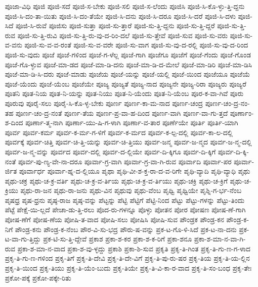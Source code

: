 {ಪೂಜಾ-ವಿಧಿ
ಪೂಜಿ
ಪೂಜಿ-ಸದೆ
ಪೂಜಿ-ಸ-ಬೇಕು
ಪೂಜಿ-ಸಲಿ
ಪೂಜಿ-ಸ-ಲೆಂದು
ಪೂಜಿಸಿ
ಪೂಜಿ-ಸಿ-ಕೊ-ಳ್ಳು-ತ್ತಿ-ದ್ದನು
ಪೂಜಿ-ಸಿ-ದಂ-ತಾ-ಯಿತು
ಪೂಜಿ-ಸಿ-ದಂ-ತೆಯೇ
ಪೂಜಿ-ಸಿ-ದನು
ಪೂಜಿ-ಸಿ-ದರೂ
ಪೂಜಿ-ಸಿ-ದರೆ
ಪೂಜಿ-ಸಿ-ದಳು
ಪೂಜಿ-ಸಿದೆ
ಪೂಜಿ-ಸಿ-ರುವೆ
ಪೂಜಿಸು
ಪೂಜಿ-ಸುತ್ತಾ
ಪೂಜಿ-ಸು-ತ್ತಾರೆ
ಪೂಜಿ-ಸು-ತ್ತಿ-ದ್ದನು
ಪೂಜಿ-ಸು-ತ್ತಿ-ದ್ದರೆ
ಪೂಜಿ-ಸು-ತ್ತಿ-ರುವ
ಪೂಜಿ-ಸು-ತ್ತಿ-ರುವಿ
ಪೂಜಿ-ಸು-ತ್ತಿ-ರು-ವು-ದ-ರಿಂ-ದಲೆ
ಪೂಜಿ-ಸು-ತ್ತೇವೆ
ಪೂಜಿ-ಸುವ
ಪೂಜಿ-ಸು-ವರು
ಪೂಜಿ-ಸು-ವ-ವನು
ಪೂಜಿ-ಸು-ವ-ವ-ರಂತೆ
ಪೂಜಿ-ಸು-ವ-ವರೇ
ಪೂಜಿ-ಸು-ವಾಗ
ಪೂಜಿ-ಸು-ವು-ದ-ರಲ್ಲಿ
ಪೂಜಿ-ಸು-ವು-ದ-ರಿಂದ
ಪೂಜಿ-ಸು-ವುದು
ಪೂಜೆ
ಪೂಜೆ-ಗಳಿಂದ
ಪೂಜೆ-ಗ-ಳೆಲ್ಲ
ಪೂಜೆ-ಗಾಗಿ
ಪೂಜೆಗೂ
ಪೂಜೆಗೆ
ಪೂಜೆ-ಗೆಂದು
ಪೂಜೆ-ಗೊಂಡ
ಪೂಜೆ-ಗೊ-ಳ್ಳುವ
ಪೂಜೆ-ಮಾ-ಡದ
ಪೂಜೆ-ಮಾ-ಡಿ-ದನು
ಪೂಜೆ-ಮಾ-ಡಿ-ದ-ಮೇಲೆ
ಪೂಜೆ-ಮಾ-ಡಿರಿ
ಪೂಜೆ-ಮಾ-ಡಿಸಿ
ಪೂಜೆ-ಮಾ-ಡಿ-ಸಿ-ದರು
ಪೂಜೆ-ಮಾಡು
ಪೂಜೆಯ
ಪೂಜೆ-ಯನ್ನು
ಪೂಜೆ-ಯಲ್ಲಿ
ಪೂಜೆ-ಯಿಂದ
ಪೂಜೆಯೂ
ಪೂಜೆಯೆ
ಪೂಜೆ-ಯೆಂದು
ಪೂಜೆ-ಯೆಂಬ
ಪೂಜೆಯೇ
ಪೂಜ್ಯ
ಪೂಜ್ಯತೆ
ಪೂಜ್ಯ-ನಾದ
ಪೂಜ್ಯನೇ
ಪೂಜ್ಯ-ರಿರಾ
ಪೂಜ್ಯರು
ಪೂಜ್ಯರೆ
ಪೂತನಿ
ಪೂತ-ನಿಯ
ಪೂತ-ನಿ-ಯನ್ನು
ಪೂತ-ನಿಯು
ಪೂತ-ನಿ-ಯೆಂದು
ಪೂತ-ನಿ-ಯೆಂಬ
ಪೂರ-ಕ-ವಾ-ಗಿವೆ
ಪೂರು
ಪೂರುವು
ಪೂರೈ-ಸಲು
ಪೂರೈ-ಸಿ-ಕೊ-ಳ್ಳ-ಬೇಕು
ಪೂರ್ಣ
ಪೂರ್ಣ-ಕಾ-ಮ-ನಾದ
ಪೂರ್ಣ-ಚಂದ್ರ
ಪೂರ್ಣ-ಚಂ-ದ್ರ-ನಂ-ತಹ
ಪೂರ್ಣ-ಚಂ-ದ್ರ-ನಂತೆ
ಪೂರ್ಣ-ತೆಯ
ಪೂರ್ಣ-ಪ್ರ-ವಾ-ಹ-ದಿಂದ
ಪೂರ್ಣ-ವಾಗಿ
ಪೂರ್ಣ-ವಾ-ಗು-ತ್ತದೆ
ಪೂರ್ಣಾಂ-ಶ-ದಿಂದ
ಪೂರ್ಣಾ-ತ್ಮ-ನಾಗಿ
ಪೂರ್ಣಾ-ಯು-ಷಿ-ಗ-ಳಾಗಿ
ಪೂರ್ಣಾ-ವ-ತಾರ
ಪೂರ್ಣೆಯೇ
ಪೂರ್ತಿ
ಪೂರ್ತಿ-ಯಾಗಿ
ಪೂರ್ವ
ಪೂರ್ವ-ಕರ್ಮ
ಪೂರ್ವ-ಕ-ರ್ಮ-ಗ-ಳಿಗೆ
ಪೂರ್ವ-ಕ-ರ್ಮದ
ಪೂರ್ವ-ಕ-ಲ್ಪ-ದಲ್ಲಿ
ಪೂರ್ವ-ಕಾ-ಲ-ದಲ್ಲಿ
ಪೂರ್ವಕ್ಕೆ
ಪೂರ್ವ-ಚಿತ್ತಿ
ಪೂರ್ವ-ಚಿ-ತ್ತಿ-ಯನ್ನು
ಪೂರ್ವ-ಚಿ-ತ್ತಿಯು
ಪೂರ್ವ-ಜನ್ಮ
ಪೂರ್ವ-ಜ-ನ್ಮದ
ಪೂರ್ವ-ಜ-ನ್ಮ-ದಲ್ಲಿ
ಪೂರ್ವ-ಜ-ನ್ಮ-ವನ್ನು
ಪೂರ್ವದ
ಪೂರ್ವ-ದಲ್ಲಿ
ಪೂರ್ವ-ದ-ಲ್ಲಿಯೇ
ಪೂರ್ವ-ದಿ-ಕ್ಕಿಗೂ
ಪೂರ್ವ-ದಿ-ಕ್ಕಿಗೆ
ಪೂರ್ವ-ದಿ-ಕ್ಕಿ-ನಂತೆ
ಪೂರ್ವ-ಪು-ಣ್ಯ-ವೇ-ನಾ-ದರೂ
ಪೂರ್ವಾ-ಗ್ರ-ವಾಗಿ
ಪೂರ್ವಾ-ಗ್ರ-ವಾ-ಗಿ-ರುವ
ಪೂರ್ವಾದಿ
ಪೂರ್ವಾ-ಪರ
ಪೂರ್ವಾ-ರ್ಜಿತ
ಪೂರ್ವಾರ್ಧ
ಪೂರ್ವಾ-ಹ್ನ-ದ-ಲ್ಲಿಯೂ
ಪೃಥಾ
ಪೃಥಿ-ವೀ-ಶ-ಕ್ತ-ರಾ-ದ-ವ-ರಿಗೇ
ಪೃಥಿ-ವ್ಯಾದಿ
ಪೃಥಿ-ವ್ಯಾಧಿ
ಪೃಥು
ಪೃಥು-ಚಕ್ರ
ಪೃಥು-ಚ-ಕ್ರ-ವರ್ತಿ
ಪೃಥು-ಚ-ಕ್ರ-ವ-ರ್ತಿಯ
ಪೃಥು-ಚ-ಕ್ರ-ವ-ರ್ತಿಯು
ಪೃಥು-ಚಕ್ರಿ
ಪೃಥು-ಚ-ಕ್ರಿಗೆ
ಪೃಥು-ಚ-ಕ್ರಿಯು
ಪೃಥು-ರಾ-ಜನ
ಪೃಥು-ರಾ-ಜನು
ಪೃಥು-ವಿನ
ಪೃಥುವು
ಪೃಥು-ವೆಂಬ
ಪೃಥ್ವಿ
ಪೃಥ್ವಿಯೇ
ಪೃಶ್ನಿ-ಗ-ರ್ಭ-ನೆಂಬ
ಪೃಷಧ್ರ
ಪೃಷ-ಧ್ರನು
ಪೃಷ್ಠ-ರಾಜ
ಪೃಷ್ಠ-ವನ್ನು
ಪೆಟ್ಟನ್ನು
ಪೆಟ್ಟಿ
ಪೆಟ್ಟಿಗೆ
ಪೆಟ್ಟಿ-ನಿಂದ
ಪೆಟ್ಟು
ಪೆಟ್ಟು-ಗಳನ್ನು
ಪೆಟ್ಟು-ತಿಂದು
ಪೆಟ್ಟೆ
ಪೇಕ್ಷೆ-ಯಿ-ಲ್ಲದೆ
ಪೇಚಾ-ಡು-ತ್ತಿ-ರಲು
ಪೊದ-ರು-ಗಳನ್ನೂ
ಪೊಳ್ಳು
ಪೋತನ
ಪೋರ
ಪೋಷಣ
ಪೋಷ-ಣೆ-ಗಾಗಿ
ಪೋಷ-ಣೆಗೆ
ಪೋಷ-ಣೆಯ
ಪೋಷಿ-ತ-ವಾದ
ಪೋಷಿ-ಸಲು
ಪೋಷಿಸಿ
ಪೋಷಿ-ಸುವ
ಪೌಂಡ್ರಕ
ಪೌಂಡ್ರ-ಕನ
ಪೌಂಡ್ರ-ಕ-ನಿಗೆ
ಪೌಂಡ್ರ-ಕನು
ಪೌಂಡ್ರ-ಕ-ನೆಂಬ
ಪೌರ-ವಿ-ಸು-ಭದ್ರ
ಪೌರು-ಷ-ವನ್ನು
ಪ್ರಕ-ಟ-ಗೊ-ಳಿ-ಸಿದೆ
ಪ್ರಕ-ಟ-ನಾ-ದನು
ಪ್ರಕ-ಟ-ವಾ-ಗು-ತ್ತಿದ್ದು
ಪ್ರಕ-ಟಿ-ಸು-ತ್ತಿ-ದ್ದೇವೆ
ಪ್ರಕಾಶ
ಪ್ರಕಾ-ಶ-ಕರ
ಪ್ರಕಾ-ಶ-ಕ-ರಿಗೆ
ಪ್ರಕಾ-ಶನೂ
ಪ್ರಕಾ-ಶ-ಮಾ-ನ-ವಾ-ಗಿ-ರುವ
ಪ್ರಕಾ-ಶ-ಮಾ-ನ-ವಾದ
ಪ್ರಕಾ-ಶ-ವು-ಳ್ಳದ್ದು
ಪ್ರಕಾಶಿ
ಪ್ರಕಾ-ಶಿ-ಸುವ
ಪ್ರಕೃತಿ
ಪ್ರಕೃ-ತಿ-ಗಿಂತ
ಪ್ರಕೃ-ತಿ-ಗು-ಣ-ಗ-ಳಾದ
ಪ್ರಕೃ-ತಿ-ಗು-ಣ-ಗಳಿಂದ
ಪ್ರಕೃ-ತಿಗೆ
ಪ್ರಕೃ-ತಿ-ದೇವಿ
ಪ್ರಕೃ-ತಿ-ದೇ-ವಿಗೆ
ಪ್ರಕೃ-ತಿ-ಪು-ರು-ಷರ
ಪ್ರಕೃ-ತಿಯ
ಪ್ರಕೃ-ತಿ-ಯ-ಲ್ಲಿನ
ಪ್ರಕೃ-ತಿ-ಯಿಂದ
ಪ್ರಕೃ-ತಿಯು
ಪ್ರಕೃ-ತಿ-ಯೆಂ-ಬುದು
ಪ್ರಕೃ-ತಿಯೇ
ಪ್ರಕೃ-ತಿ-ವಿ-ಕಾ-ರ-ವಾದ
ಪ್ರಕೃ-ತಿ-ಸಂ-ಬಂಧ
ಪ್ರಕೃ-ತೇಃ
ಪ್ರಕೋ-ಪಕ್ಕೆ
ಪ್ರಕೋ-ಪಕ್ಕೇ-ರಿತು
}
